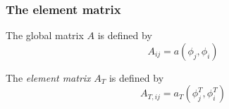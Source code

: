 \begin{frame}
  \frametitle{The element matrix}

  The global matrix $A$ is defined by
  \begin{equation*}
    A_{ij} = a(\phi_j, \phi_i)
  \end{equation*}

  \bigskip

  The \emph{element matrix} $A_T$ is defined by
  \begin{equation*}
    A_{T,ij} = a_T(\phi_j^T, \phi_i^T)
  \end{equation*}

\end{frame}
